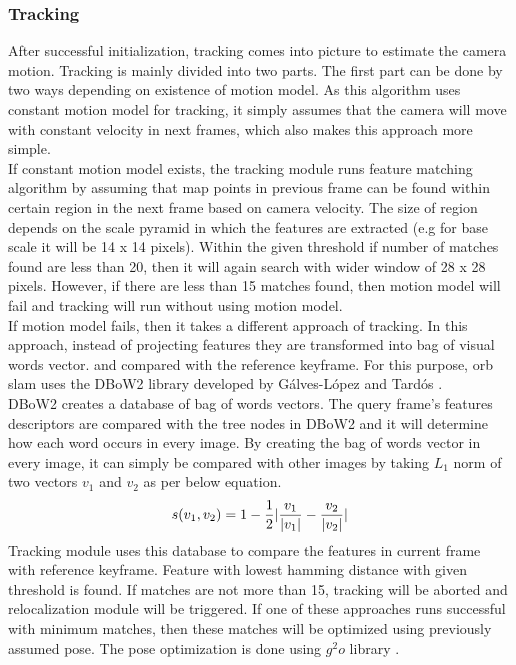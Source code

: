 \subsubsection{Tracking}
After successful initialization, tracking comes into picture to estimate the camera motion.
Tracking is mainly divided into two parts. The first part can be done by two ways depending on existence of motion model. As this algorithm uses constant motion model for tracking, it simply assumes that the camera will move with constant velocity in next frames, which also makes this approach more simple. \\
\linebreak
If constant motion model exists, the tracking module runs feature matching algorithm by assuming that map points in previous frame can be found within certain region in the next frame based on camera velocity. The size of region depends on the scale pyramid in which the features are extracted (e.g for base scale it will be 14 x 14 pixels). Within the given threshold if number of matches found are less than 20, then it will again search with wider window of 28 x 28 pixels. However, if there are less than 15 matches found, then motion model will fail and tracking will run without using motion model.\\
\linebreak
If motion model fails, then it takes a different approach of tracking. In this approach, instead of projecting features they are transformed into bag of visual words vector.  and compared with the reference keyframe. For this purpose, \acrshort{orb} \acrshort{slam} uses the DBoW2 library developed by Gálves-López and Tardós \cite{DboW}. \\
\linebreak
DBoW2 creates a database of bag of words vectors. The query frame's features descriptors are compared with the tree nodes in DBoW2 and it will determine how each word occurs in every image. By creating the bag of words vector in every image, it can simply be compared with other images by taking $ L_{1} $ norm of two vectors $ v_{1} $ and $ v_{2} $  as per below equation.
\begin{equation*}
s(v_{1},v_{2}) = 1 - \frac{1}{2} \arrowvert \frac{v_{1}}{|v_{1}|} - \frac{v_{2}}{|v_{2}|} \arrowvert 
\label{norm}
\end{equation*}  
\linebreak 
Tracking module uses this database to compare the features in current frame with reference keyframe. Feature with lowest hamming distance with given threshold is found. If matches are not more than 15, tracking will be aborted and relocalization module will be triggered. If one of these approaches runs successful with minimum matches, then these matches will be optimized using previously assumed pose. The pose optimization is done using $ g^{2}o $ library \cite{g2o}. \\
